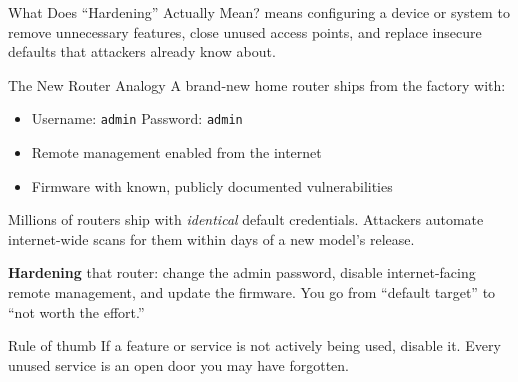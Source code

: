 \documentclass[aspectratio=169]{beamer}  %
\begin{document}
\begin{frame}{What Does ``Hardening'' Actually Mean?}
    \footnotesize
     means configuring a device or system to remove unnecessary features, close unused access points, and replace insecure defaults that attackers already know about.

    \vspace{0.4em}
    \begin{exampleblock}{The New Router Analogy}
        \footnotesize
        A brand-new home router ships from the factory with:
        \begin{itemize}
            \item Username: \texttt{admin} \quad Password: \texttt{admin}
            \item Remote management enabled from the internet
            \item Firmware with known, publicly documented vulnerabilities
        \end{itemize}
        Millions of routers ship with \emph{identical} default credentials. Attackers automate internet-wide scans for them within days of a new model's release.

        \vspace{0.2em}
        \textbf{Hardening} that router: change the admin password, disable internet-facing remote management, and update the firmware. You go from ``default target'' to ``not worth the effort.''
    \end{exampleblock}

    \begin{alertblock}{Rule of thumb}
        \footnotesize
        If a feature or service is not actively being used, disable it. Every unused service is an open door you may have forgotten.
    \end{alertblock}
\end{frame}
\end{document}
